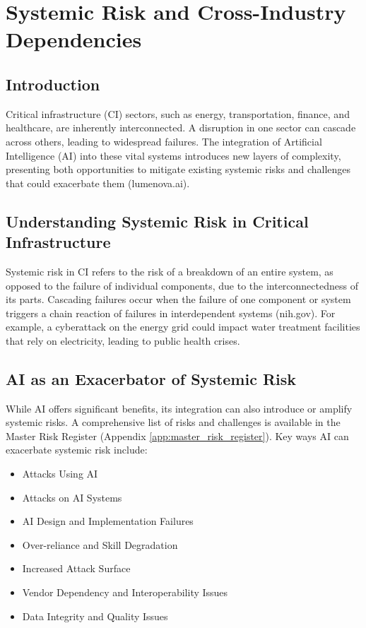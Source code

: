 \chapter{Systemic Risk and Cross-Industry Dependencies}
\section{Introduction}
Critical infrastructure (CI) sectors, such as energy, transportation, finance, and healthcare, are inherently interconnected. A disruption in one sector can cascade across others, leading to widespread failures. The integration of Artificial Intelligence (AI) into these vital systems introduces new layers of complexity, presenting both opportunities to mitigate existing systemic risks and challenges that could exacerbate them (lumenova.ai).

\section{Understanding Systemic Risk in Critical Infrastructure}
Systemic risk in CI refers to the risk of a breakdown of an entire system, as opposed to the failure of individual components, due to the interconnectedness of its parts. Cascading failures occur when the failure of one component or system triggers a chain reaction of failures in interdependent systems (nih.gov). For example, a cyberattack on the energy grid could impact water treatment facilities that rely on electricity, leading to public health crises.

\section{AI as an Exacerbator of Systemic Risk}

While AI offers significant benefits, its integration can also introduce or amplify systemic risks. A comprehensive list of risks and challenges is available in the Master Risk Register (Appendix \ref{app:master_risk_register}). Key ways AI can exacerbate systemic risk include:

\begin{itemize}
    \item Attacks Using AI
    \item Attacks on AI Systems
    \item AI Design and Implementation Failures
    \item Over-reliance and Skill Degradation
    \item Increased Attack Surface
    \item Vendor Dependency and Interoperability Issues
    \item Data Integrity and Quality Issues
\end{itemize}


